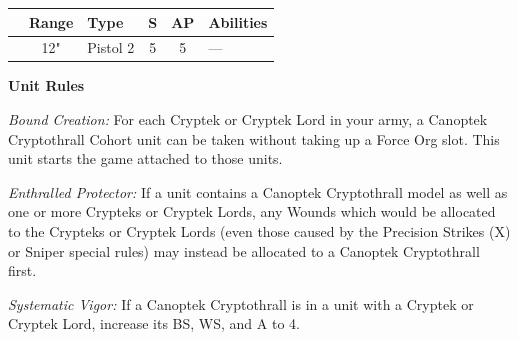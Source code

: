 \begin{minipage}[t]{0.72\textwidth}
	\begin{tabular}{L{90 pt} c C{40pt} *{2}{c} >{\raggedright\arraybackslash}p{130pt}}
		& Range & Type & S & AP & Abilities \\
		\hline
		 & 12" & Pistol 2 & 5 & 5 & — \\
	\end{tabular}
	
	\vspace*{2em}
	\textbf{Unit Rules}
	
	\textit{Bound Creation:} For each Cryptek or Cryptek Lord in your army, a Canoptek Cryptothrall Cohort unit can be taken without taking up a Force Org slot. This unit starts the game attached to those units.
	
	\textit{Enthralled Protector:} If a unit contains a Canoptek Cryptothrall model as well as one or more Crypteks or Cryptek Lords, any Wounds which would be allocated to the Crypteks or Cryptek Lords (even those caused by the Precision Strikes (X) or Sniper special rules) may instead be allocated to a Canoptek Cryptothrall first.
	
	\textit{Systematic Vigor:} If a Canoptek Cryptothrall is in a unit with a Cryptek or Cryptek Lord, increase its BS, WS, and A to 4.
\end{minipage}
\hspace{0.5em}


\newpage
